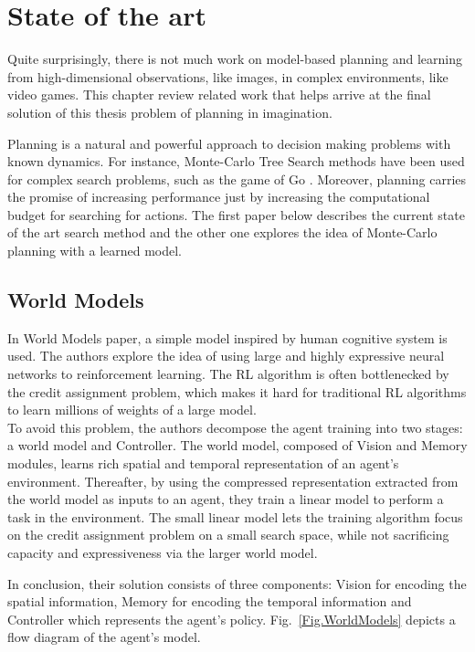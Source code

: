 \section{State of the art}

Quite surprisingly, there is not much work on model-based planning and learning from high-dimensional observations, like images, in complex environments, like video games. This chapter review related work that helps arrive at the final solution of this thesis problem of planning in imagination.

Planning is a natural and powerful approach to decision making problems with known dynamics. For instance, Monte-Carlo Tree Search methods \cite{Algo.MCTS} have been used for complex search problems, such as the game of Go \cite{Algo.AlphaGoZero}. Moreover, planning carries the promise of increasing performance just by increasing the computational budget for searching for actions. The first paper below describes the current state of the art search method and the other one explores the idea of Monte-Carlo planning with a learned model.

\subsection{World Models} \label{Sec.WorldModels}

In World Models \cite{Algo.WorldModels} paper, a simple model inspired by human cognitive system is used. The authors explore the idea of using large and highly expressive neural networks to reinforcement learning. The RL algorithm is often bottlenecked by the credit assignment problem, which makes it hard for traditional RL algorithms to learn millions of weights of a large model. \\
To avoid this problem, the authors decompose the agent training into two stages: a world model and Controller. The world model, composed of Vision and Memory modules, learns rich spatial and temporal representation of an agent's environment. Thereafter, by using the compressed representation extracted from the world model as inputs to an agent, they train a linear model to perform a task in the environment. The small linear model lets the training algorithm focus on the credit assignment problem on a small search space, while not sacrificing capacity and expressiveness via the larger world model.

In conclusion, their solution consists of three components: Vision for encoding the spatial information, Memory for encoding the temporal information and Controller which represents the agent's policy. Fig.~\ref{Fig.WorldModels} depicts a flow diagram of the agent's model.


